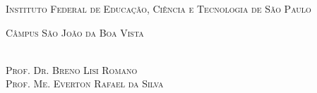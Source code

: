\begin{titlingpage}
    
    
    \center
    
    \noindent
    \chaptitlefont\large\textsc{Instituto Federal de Educação, Ciência e Tecnologia de São Paulo}
    \vspace{0.5cm}

    \noindent    
    \chaptitlefont\large\textsc{Câmpus São João da Boa Vista}
    \vspace{3.5cm}
    
    \noindent
    \chaptitlefont\Large\textsc{\theauthor}
    \vspace{0.5cm}
    \\\chaptitlefont\large\textsc{Prof. Dr. Breno Lisi Romano}
    \\\chaptitlefont\large\textsc{Prof. Me. Everton Rafael da Silva}
    \vspace{3.5cm}
    
    \noindent
    \chaptitlefont\HUGE\textsc{\thetitle}
    \vspace*{\fill}

    \noindent
    \large\textsc{\thedate}
    
    \restoregeometry
    
\end{titlingpage}

